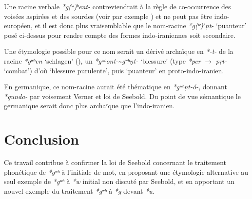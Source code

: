 \documentclass[11pt]{article}
\newcommand{\ipa}[1]{{\phon\textit{#1}}}
\begin{document}
Une racine verbale \ipa{*g(ʷ)ʰent-} contreviendrait à la règle de co-occurrence des voisées aspirées et des sourdes (voir par exemple \citealt{kuemmel12pie}) et ne peut pas être indo-européen, et il est donc plus vraisemblable que le nom-racine \ipa{*g(ʷ)ʰṇt-} `puanteur' posé ci-dessus pour rendre compte des formes indo-iraniennes soit secondaire.

Une étymologie possible pour ce nom serait un dérivé  archaïque en \ipa{*-t-} de la racine \ipa{*gʷʰen} `schlagen' (\citealt[218]{liv}), un \ipa{*gʷʰont-\textasciitilde *gʷʰṇt-} `blessure' (type \ipa{*per} $\rightarrow$ \ipa{pṛt-} `combat') d'où `blessure purulente', puis `puanteur' en proto-indo-iranien.

En germanique, ce nom-racine aurait été thématique en \ipa{*gʷʰṇt-ó-}, donnant \ipa{*gunda-} par voisement Verner et loi de Seebold. Du point de vue sémantique le germanique serait donc plus archaïque que l'indo-iranien.

\section{Conclusion}
Ce travail contribue à confirmer la loi de Seebold concernant le traitement phonétique de \ipa{*gʷʰ} à l'initiale de mot, en proposant une étymologie alternative au seul exemple de \ipa{*gʷʰ} à \ipa{*w} initial non discuté par Seebold, et en apportant un nouvel exemple du traitement \ipa{*gʷʰ} à \ipa{*g} devant \ipa{*u}. 





 
\end{document}

